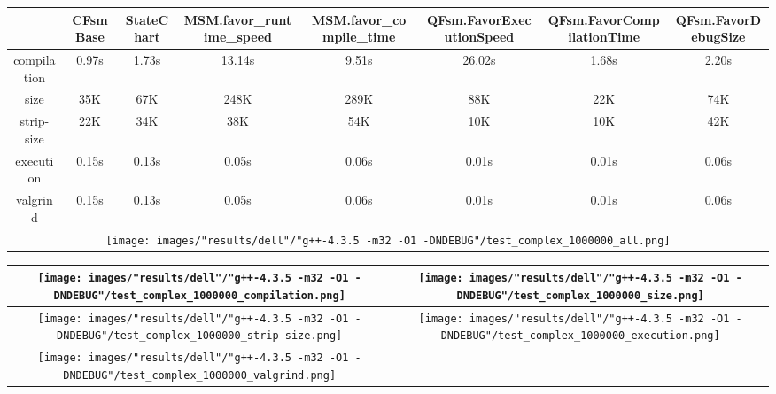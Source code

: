 \begin{landscape}
\begin{table}
\caption{"dell" [df6407d], g++-4.3.5 -m32 -O1 -DNDEBUG/test complex 1000000}
\centering
\begin{longtable}{| c | c |c |c |c |c |c |c |}
\hline
& CFsmBase& StateChart& MSM.favor\_runtime\_speed& MSM.favor\_compile\_time& QFsm.FavorExecutionSpeed& QFsm.FavorCompilationTime& QFsm.FavorDebugSize\\
\hline
compilation & 0.97s & 1.73s & 13.14s & 9.51s & 26.02s & 1.68s & 2.20s\\
\hline
size & 35K & 67K & 248K & 289K & 88K & 22K & 74K\\
\hline
strip-size & 22K & 34K & 38K & 54K & 10K & 10K & 42K\\
\hline
execution & 0.15s & 0.13s & 0.05s & 0.06s & 0.01s & 0.01s & 0.06s\\
\hline
valgrind & 0.15s & 0.13s & 0.05s & 0.06s & 0.01s & 0.01s & 0.06s\\
\hline
\multicolumn{8}{|c|}{\texttt{[image: images/"results/dell"/"g++-4.3.5 -m32 -O1 -DNDEBUG"/test\_complex\_1000000\_all.png]}}\\
\hline
\end{longtable}
\end{table}
\end{landscape}
\newpage
\begin{table}
\centering
\begin{longtable}{| c | c |}
\hline
\texttt{[image: images/"results/dell"/"g++-4.3.5 -m32 -O1 -DNDEBUG"/test\_complex\_1000000\_compilation.png]}& \texttt{[image: images/"results/dell"/"g++-4.3.5 -m32 -O1 -DNDEBUG"/test\_complex\_1000000\_size.png]}\\
\hline
\texttt{[image: images/"results/dell"/"g++-4.3.5 -m32 -O1 -DNDEBUG"/test\_complex\_1000000\_strip-size.png]}& \texttt{[image: images/"results/dell"/"g++-4.3.5 -m32 -O1 -DNDEBUG"/test\_complex\_1000000\_execution.png]}\\
\hline
\texttt{[image: images/"results/dell"/"g++-4.3.5 -m32 -O1 -DNDEBUG"/test\_complex\_1000000\_valgrind.png]}& \\ \hline
\end{longtable}
\end{table}
